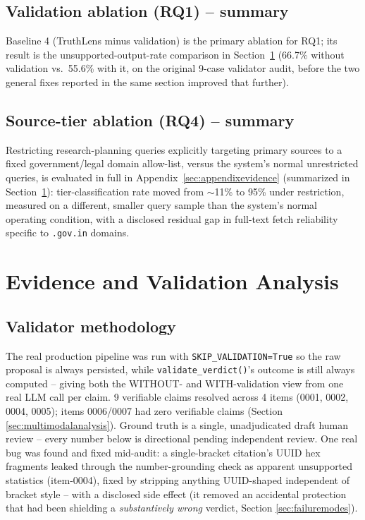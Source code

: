 \documentclass[conference]{IEEEtran}
\begin{document}
\subsection{Validation ablation (RQ1) -- summary}
Baseline 4 (TruthLens minus validation) is the primary ablation for RQ1;
its result is the unsupported-output-rate comparison in
Section~\ref{sec:evidencevalidation} (66.7\% without validation vs.\ 55.6\%
with it, on the original 9-case validator audit, before the two general
fixes reported in the same section improved that further).

\subsection{Source-tier ablation (RQ4) -- summary}
Restricting research-planning queries explicitly targeting primary sources
to a fixed government/legal domain allow-list, versus the system's normal
unrestricted queries, is evaluated in full in Appendix~\ref{sec:appendixevidence}
(summarized in Section~\ref{sec:evidencevalidation}):
tier-classification rate moved from $\sim$11\% to 95\% under restriction,
measured on a different, smaller query sample than the system's normal
operating condition, with a disclosed residual gap in full-text fetch
reliability specific to \texttt{.gov.in} domains.

\section{Evidence and Validation Analysis}
\label{sec:evidencevalidation}

\subsection{Validator methodology}
The real production pipeline was run with \texttt{SKIP\_VALIDATION=True}
so the raw proposal is always persisted, while
\texttt{validate\_verdict()}'s outcome is still always computed --
giving both the WITHOUT- and WITH-validation view from one real LLM call
per claim. 9 verifiable claims resolved across 4 items (0001, 0002, 0004,
0005); items 0006/0007 had zero verifiable claims (Section
\ref{sec:multimodalanalysis}). Ground truth is a single, unadjudicated
draft human review -- every number below is directional pending
independent review. One real bug was found and fixed mid-audit: a
single-bracket citation's UUID hex fragments leaked through the
number-grounding check as apparent unsupported statistics (item-0004),
fixed by stripping anything UUID-shaped independent of bracket style --
with a disclosed side effect (it removed an accidental protection that
had been shielding a \emph{substantively wrong} verdict, Section
\ref{sec:failuremodes}).
\end{document}
